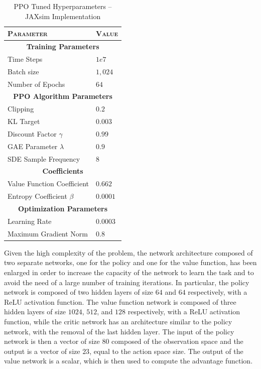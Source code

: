 \begin{table}[h]
    \centering
    \begin{tabular}{ll}
        \toprule
        \textsc{Parameter}          & \textsc{Value}          \\
        \midrule
        \multicolumn{2}{c}{\textbf{Training Parameters}}      \\
        Time Steps                  & $1e7$                   \\
        Batch size                  & $1,024$                 \\
        Number of Epochs            & $64$                    \\
        \midrule
        \multicolumn{2}{c}{\textbf{PPO Algorithm Parameters}} \\
        Clipping                    & $0.2$                   \\
        KL Target                   & $0.003$                 \\
        Discount Factor $\gamma$    & $0.99$                  \\
        GAE Parameter $\lambda$     & $0.9$                   \\
        SDE Sample Frequency        & $8$                     \\
        \midrule
        \multicolumn{2}{c}{\textbf{Coefficients}}             \\
        Value Function Coefficient  & $0.662$                 \\
        Entropy Coefficient $\beta$ & $0.0001$                \\
        \midrule
        \multicolumn{2}{c}{\textbf{Optimization Parameters}}  \\
        Learning Rate               & $0.0003$                \\
        Maximum Gradient Norm       & $0.8$                   \\
        \bottomrule
    \end{tabular}
    \caption{PPO Tuned Hyperparameters -- JAXsim Implementation}
    \label{tab:ppohyperparameters_jaxsim}
\end{table}

Given the high complexity of the problem, the network architecture composed of two separate networks, one for the policy and one for the value function, has been enlarged in order to increase the capacity of the network to learn the task and to avoid the need of a large number of training iterations. In particular, the policy network is composed of two hidden layers of size $64$ and $64$ respectively, with a \ac{ReLU} activation function. The value function network is composed of three hidden layers of size $1024$, $512$, and $128$ respectively, with a \ac{ReLU} activation function, while the critic network has an architecture similar to the policy network, with the removal of the last hidden layer. The input of the policy network is then a vector of size $80$ composed of the observation space and the output is a vector of size $23$, equal to the action space size.
The output of the value network is a scalar, which is then used to compute the advantage function.

